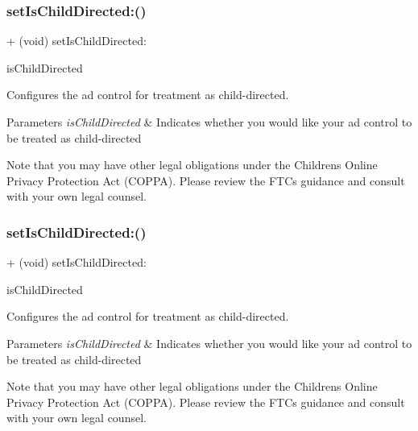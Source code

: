 \subsubsection{\texorpdfstring{set\+Is\+Child\+Directed\+:()}{setIsChildDirected:()}\hspace{0.1cm}{\footnotesize\ttfamily [2/5]}}
{\footnotesize\ttfamily + (void) set\+Is\+Child\+Directed\+: \begin{DoxyParamCaption}\item[{(B\+O\+OL)}]{is\+Child\+Directed }\end{DoxyParamCaption}}

Configures the ad control for treatment as child-\/directed.


\begin{DoxyParams}{Parameters}
{\em is\+Child\+Directed} & Indicates whether you would like your ad control to be treated as child-\/directed\\
\hline
\end{DoxyParams}
Note that you may have other legal obligations under the Children\textquotesingle{}s Online Privacy Protection Act (C\+O\+P\+PA). Please review the F\+TC\textquotesingle{}s guidance and consult with your own legal counsel. \mbox{\label{interfaceFBAdSettings_a0f1e7129f1c07b5420d9a6a1f7eb9768}} 
\subsubsection{\texorpdfstring{set\+Is\+Child\+Directed\+:()}{setIsChildDirected:()}\hspace{0.1cm}{\footnotesize\ttfamily [3/5]}}
{\footnotesize\ttfamily + (void) set\+Is\+Child\+Directed\+: \begin{DoxyParamCaption}\item[{(B\+O\+OL)}]{is\+Child\+Directed }\end{DoxyParamCaption}}

Configures the ad control for treatment as child-\/directed.


\begin{DoxyParams}{Parameters}
{\em is\+Child\+Directed} & Indicates whether you would like your ad control to be treated as child-\/directed\\
\hline
\end{DoxyParams}
Note that you may have other legal obligations under the Children\textquotesingle{}s Online Privacy Protection Act (C\+O\+P\+PA). Please review the F\+TC\textquotesingle{}s guidance and consult with your own legal counsel. \mbox{\label{interfaceFBAdSettings_a0f1e7129f1c07b5420d9a6a1f7eb9768}} 
